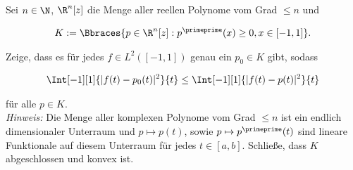 \begin{exercise}

Sei $n \in \N$, $\R^n[z]$ die Menge aller reellen Polynome vom Grad $\leq n$ und

\begin{align*}
  K := \Bbraces
  {
    p \in \R^n[z]:
    p^\primeprime(x) \geq 0,
    x \in [-1, 1]
  }.
\end{align*}

Zeige, dass es für jedes $f \in L^2([-1, 1])$ genau ein $p_0 \in K$ gibt, sodass

\begin{align*}
  \Int[-1][1]{|f(t) - p_0(t)|^2}{t}
  \leq
  \Int[-1][1]{|f(t) - p(t)|^2}{t}
\end{align*}

für alle $p \in K$. \\

\textit{Hinweis:}
Die Menge aller komplexen Polynome vom Grad $\leq n$ ist ein endlich dimensionaler Unterraum und $p \mapsto p(t)$, sowie $p \mapsto p^\primeprime(t)$ sind lineare Funktionale auf diesem Unterraum für jedes $t \in [a, b]$.
Schließe, dass $K$ abgeschlossen und konvex ist.

\end{exercise}

